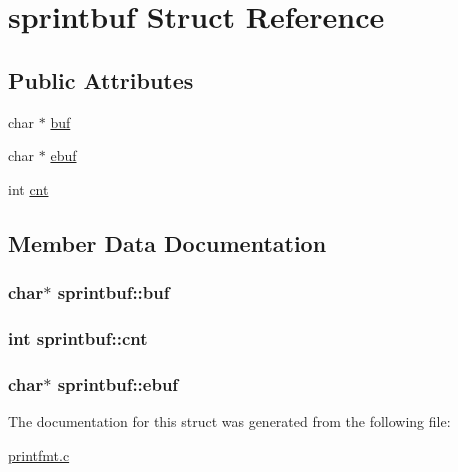 \hypertarget{structsprintbuf}{}\section{sprintbuf Struct Reference}
\label{structsprintbuf}
\subsection*{Public Attributes}
\begin{DoxyCompactItemize}
\item 
char $\ast$ \hyperlink{structsprintbuf_a73c3ae0ec99def51340175cb60059e27}{buf}
\item 
char $\ast$ \hyperlink{structsprintbuf_a792c357caab86cb2bdf2e6e8f1831bcc}{ebuf}
\item 
int \hyperlink{structsprintbuf_ae554d82663f5939b5fd5369d80a4910c}{cnt}
\end{DoxyCompactItemize}


\subsection{Member Data Documentation}
\subsubsection[{\texorpdfstring{buf}{buf}}]{\setlength{\rightskip}{0pt plus 5cm}char$\ast$ sprintbuf\+::buf}\hypertarget{structsprintbuf_a73c3ae0ec99def51340175cb60059e27}{}\label{structsprintbuf_a73c3ae0ec99def51340175cb60059e27}
\subsubsection[{\texorpdfstring{cnt}{cnt}}]{\setlength{\rightskip}{0pt plus 5cm}int sprintbuf\+::cnt}\hypertarget{structsprintbuf_ae554d82663f5939b5fd5369d80a4910c}{}\label{structsprintbuf_ae554d82663f5939b5fd5369d80a4910c}
\subsubsection[{\texorpdfstring{ebuf}{ebuf}}]{\setlength{\rightskip}{0pt plus 5cm}char$\ast$ sprintbuf\+::ebuf}\hypertarget{structsprintbuf_a792c357caab86cb2bdf2e6e8f1831bcc}{}\label{structsprintbuf_a792c357caab86cb2bdf2e6e8f1831bcc}


The documentation for this struct was generated from the following file\+:\begin{DoxyCompactItemize}
\item 
\hyperlink{printfmt_8c}{printfmt.\+c}\end{DoxyCompactItemize}
